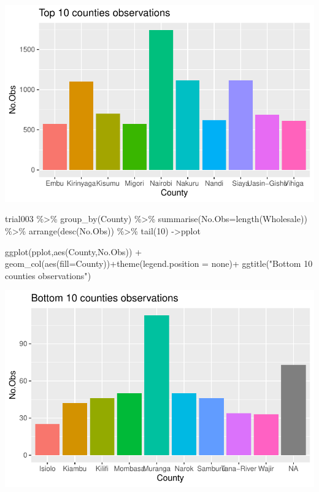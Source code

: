 \documentclass[
  letterpaper,
  DIV=11,
  numbers=noendperiod]{scrartcl}
\newenvironment{Shaded}{\begin{snugshade}}{\end{snugshade}}
\newcommand{\AttributeTok}[1]{\textcolor[rgb]{0.40,0.45,0.13}{#1}}
\newcommand{\DecValTok}[1]{\textcolor[rgb]{0.68,0.00,0.00}{#1}}
\newcommand{\FunctionTok}[1]{\textcolor[rgb]{0.28,0.35,0.67}{#1}}
\newcommand{\NormalTok}[1]{\textcolor[rgb]{0.00,0.23,0.31}{#1}}
\newcommand{\OtherTok}[1]{\textcolor[rgb]{0.00,0.23,0.31}{#1}}
\newcommand{\SpecialCharTok}[1]{\textcolor[rgb]{0.37,0.37,0.37}{#1}}
\newcommand{\StringTok}[1]{\textcolor[rgb]{0.13,0.47,0.30}{#1}}
\begin{document}
\includegraphics{Maize_analysis_files/figure-pdf/unnamed-chunk-12-1.pdf}

\begin{Shaded}
\begin{Highlighting}[]
\NormalTok{trial003 }\SpecialCharTok{\%\textgreater{}\%} \FunctionTok{group\_by}\NormalTok{(County) }\SpecialCharTok{\%\textgreater{}\%} \FunctionTok{summarise}\NormalTok{(}\AttributeTok{No.Obs=}\FunctionTok{length}\NormalTok{(Wholesale)) }\SpecialCharTok{\%\textgreater{}\%} \FunctionTok{arrange}\NormalTok{(}\FunctionTok{desc}\NormalTok{(No.Obs)) }\SpecialCharTok{\%\textgreater{}\%} \FunctionTok{tail}\NormalTok{(}\DecValTok{10}\NormalTok{) }\OtherTok{{-}\textgreater{}}\NormalTok{pplot}

\FunctionTok{ggplot}\NormalTok{(pplot,}\FunctionTok{aes}\NormalTok{(County,No.Obs)) }\SpecialCharTok{+} \FunctionTok{geom\_col}\NormalTok{(}\FunctionTok{aes}\NormalTok{(}\AttributeTok{fill=}\NormalTok{County))}\SpecialCharTok{+}\FunctionTok{theme}\NormalTok{(}\AttributeTok{legend.position =} \StringTok{\textquotesingle{}none\textquotesingle{}}\NormalTok{)}\SpecialCharTok{+} \FunctionTok{ggtitle}\NormalTok{(}\StringTok{"Bottom 10 counties observations"}\NormalTok{)}
\end{Highlighting}
\end{Shaded}

\includegraphics{Maize_analysis_files/figure-pdf/unnamed-chunk-12-2.pdf}
\end{document}
